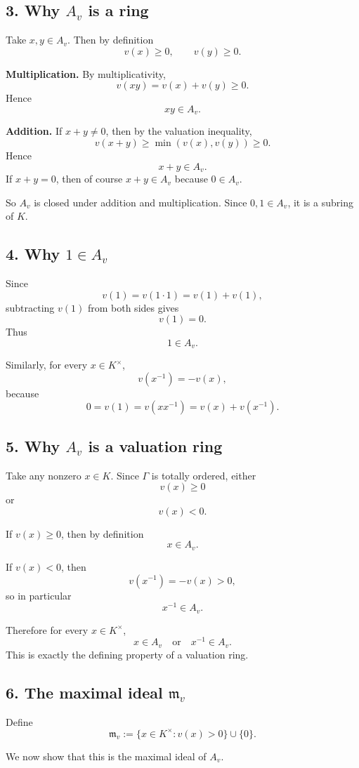 \documentclass[12pt,a4paper]{article}
\theoremstyle{notespace}
\begin{document}
\subsection{3. Why \(A_v\) is a ring}

Take \(x,y\in A_v\). Then by definition
\[
v(x)\ge 0,
\qquad
v(y)\ge 0.
\]

\textbf{Multiplication.}
By multiplicativity,
\[
v(xy)=v(x)+v(y)\ge 0.
\]
Hence
\[
xy\in A_v.
\]

\textbf{Addition.}
If \(x+y\neq 0\), then by the valuation inequality,
\[
v(x+y)\ge \min(v(x),v(y))\ge 0.
\]
Hence
\[
x+y\in A_v.
\]
If \(x+y=0\), then of course \(x+y\in A_v\) because \(0\in A_v\).

So \(A_v\) is closed under addition and multiplication. Since \(0,1\in A_v\), it is a subring of \(K\).

\subsection{4. Why \(1\in A_v\)}

Since
\[
v(1)=v(1\cdot 1)=v(1)+v(1),
\]
subtracting \(v(1)\) from both sides gives
\[
v(1)=0.
\]
Thus
\[
1\in A_v.
\]

Similarly, for every \(x\in K^\times\),
\[
v(x^{-1})=-v(x),
\]
because
\[
0=v(1)=v(xx^{-1})=v(x)+v(x^{-1}).
\]

\subsection{5. Why \(A_v\) is a valuation ring}

Take any nonzero \(x\in K\). Since \(\Gamma\) is totally ordered, either
\[
v(x)\ge 0
\]
or
\[
v(x)<0.
\]

If \(v(x)\ge 0\), then by definition
\[
x\in A_v.
\]

If \(v(x)<0\), then
\[
v(x^{-1})=-v(x)>0,
\]
so in particular
\[
x^{-1}\in A_v.
\]

Therefore for every \(x\in K^\times\),
\[
x\in A_v
\quad \text{or} \quad
x^{-1}\in A_v.
\]
This is exactly the defining property of a valuation ring.

\subsection{6. The maximal ideal \(\mathfrak m_v\)}

Define
\[
\mathfrak m_v:=\{x\in K^\times : v(x)>0\}\cup\{0\}.
\]

We now show that this is the maximal ideal of \(A_v\).
\end{document}
